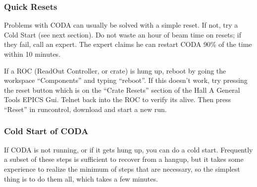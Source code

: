 {\begin{itemize}
\end{itemize}

\subsubsection{ Quick Resets }

Problems with CODA can usually be solved with a simple
reset.  If not, try a Cold Start (see next section).
Do not waste an hour of beam time on resets; 
if they fail, call an expert.  
The expert claims he can restart CODA 
90\% of the time within 10 minutes.

If a ROC (ReadOut Controller, or crate)
is hung up, reboot by going the workspace
``Components'' and typing ``reboot''.  If this 
doesn't work, try pressing the reset button 
which is on the ``Crate Resets'' section of the
Hall A General Tools EPICS Gui.  Telnet back into
the ROC to verify its alive.  Then press ``Reset''
in runcontrol, download and start a new run.

\subsubsection{ Cold Start of CODA}

\par
If CODA is not running, or if it gets hung up,
you can do a cold start.  Frequently a subset of
these steps is sufficient to recover from a hangup,
but it takes some experience to realize the
minimum of steps that
are necessary, so the simplest 
thing is to do them all, which takes a few minutes.

}
